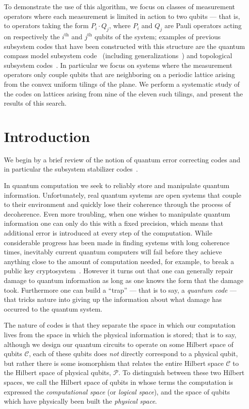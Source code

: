 \documentclass[twocolumn,showpacs,preprintnumbers,amsmath,amssymb,nofootinbib,pra,floatfix]{revtex4-1}
\begin{document}
To demonstrate the use of this algorithm, we focus on classes of measurement operators where each measurement is limited in action to two qubits --- that is, to operators taking the form $P_i \cdot Q_j$, where $P_i$ and $Q_j$ are Pauli operators acting on respectively the $i^{\text{th}}$ and $j^{\text{th}}$ qubits of the system;  examples of previous subsystem codes that have been constructed with this structure are the quantum compass model subsystem code~\cite{Bacon:06a} (including generalizations~\cite{Bacon:06b,Bravyi:10a}) and topological subsystem codes~\cite{Bombin:10a}.  In particular we focus on systems where the measurement operators only couple qubits that are neighboring on a periodic lattice arising from the convex uniform tilings of the plane.  We perform a systematic study of the codes on lattices arising from nine of the eleven such tilings, and present the results of this search.
\listoftables
\tableofcontents
\section{Introduction}

We begin by a brief review of the notion of quantum error correcting codes and in particular the subsystem stabilizer codes~\cite{Poulin:05a}.

In quantum computation we seek to reliably store and manipulate quantum information.  Unfortunately, real quantum systems are open systems that couple to their environment and quickly lose their coherence through the process of decoherence.  Even more troubling, when one wishes to manipulate quantum information one can only do this with a fixed precision, which means that additional error is introduced at every step of the computation.  While considerable progress has been made in finding systems with long coherence times, inevitably current quantum computers will fail before they achieve anything close to the amount of computation needed, for example, to break a public key cryptosystem~\cite{Shor:94a}.  However it turns out that one can generally repair damage to quantum information as long as one knows the form that the damage took.  Furthermore one can build a ``trap'' --- that is to say, a
\emph{quantum code} --- that tricks nature into giving up the information about what damage has occurred to the quantum system.

The nature of codes is that they separate the space in which our computation lives from the space in which the physical information is
stored; that is to say, although we design our quantum circuits to operate on some Hilbert space of qubits $\mathscr{C}$, each of these qubits
does \emph{not} directly correspond to a physical qubit, but rather there is some isomorphism that relates the entire Hilbert space $\mathscr{C}$
to the Hilbert space of physical qubits, $\mathscr{P}$.  To distinguish between these two Hilbert spaces, we call the Hilbert space of qubits in whose terms the computation is expressed the \emph{computational space} (or \emph{logical space}), and the space of qubits which have physically been built the
\emph{physical space}.
\end{document}
